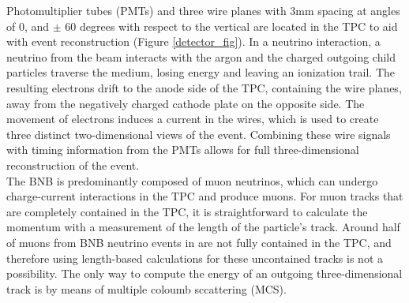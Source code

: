 Photomultiplier tubes (PMTs) and three wire planes with 3mm spacing at angles of 0, and $\pm$ 60 degrees with respect to the vertical are located in the TPC to aid with event reconstruction (Figure \ref{detector_fig}). In a neutrino interaction, a neutrino from the beam interacts with the argon and the charged outgoing child particles traverse the medium, losing energy and leaving an ionization trail. The resulting electrons drift to the anode side of the TPC, containing the wire planes, away from the negatively charged cathode plate on the opposite side. The movement of electrons induces a current in the wires, which is used to create three distinct two-dimensional views of the event. Combining these wire signals with timing information from the PMTs allows for full three-dimensional reconstruction of the event.\\





The BNB is predominantly composed of muon neutrinos, which can undergo charge-current interactions in the TPC and produce muons. For muon tracks that are completely contained in the TPC, it is straightforward to calculate the momentum with a measurement of the length of the particle's track. Around half of muons from BNB neutrino events in {\ub} are not fully contained in the TPC, and therefore using length-based calculations for these uncontained tracks is not a possibility. The only way to compute the energy of an outgoing three-dimensional track is by means of multiple coloumb sccattering (MCS). \\

